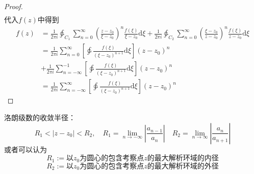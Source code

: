 \documentclass[10pt, a4paper, oneside]{ctexbook}
\def\D{\mathrm{d}}
\newcommand{\F}[1][z]
{\ensuremath{f(#1)}}
\begin{document}
\begin{proof}
\begin{align*}
    \end{align*}
    代入$\F$中得到
    \begin{align*}
        \F&=\frac{1}{2\pi i} \ointctrclockwise_{C_1} \sum_{n=0}^\infty  \left(\frac{z-z_0}{\xi-z_0}\right)^n  \frac{\F[\xi]}{\xi-z_0} \D \xi 
        + \frac{1}{2\pi i} \ointctrclockwise_{C_2} \sum_{n=0}^\infty \left(\frac{\xi-z_0}{z-z_0}\right)^n  \frac{\F[\xi]}{z-z_0} \D \xi\\
        &= \frac{1}{2\pi i}  \sum_{n=0}^\infty \left[\ointctrclockwise \frac{\F[\xi]}{(\xi-z_0)^{n+1}}\D \xi \right](z-z_0)^n \\
        & +\frac{1}{2\pi i}  \sum_{n=-\infty}^{-1} \left[\ointctrclockwise \frac{\F[\xi]}{(\xi-z_0)^{n+1}}\D \xi\right](z-z_0)^n  \\
        &= \frac{1}{2\pi i}  \sum_{n=-\infty}^\infty \left[\ointctrclockwise \frac{\F[\xi]}{(\xi-z_0)^{n+1}}\D \xi \right](z-z_0)^n
    \end{align*}
\end{proof}
洛朗级数的收敛半径：
$$
R_1<|z-z_0|<R_2,\quad R_1=\lim_{n\to -\infty} \left| \frac{a_{n-1}}{a_n} \right|\quad R_2=\lim_{n \to \infty} \left| \frac{a_n}{a_{n+1}} \right|
$$
或者可以认为
$$R_1 := \text{以$z_0$为圆心的包含考察点$z$的最大解析环域的内径}$$
$$R_2 := \text{以$z_0$为圆心的包含考察点$z$的最大解析环域的外径}$$
\end{document}

